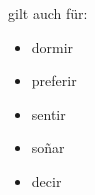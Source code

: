 \documentclass{../spanish_summary}
\begin{document}
gilt auch für:
\begin{itemize}
  \item dormir
  \item preferir
  \item sentir
  \item so\~{n}ar
  \item decir
\end{itemize}
\end{document}
